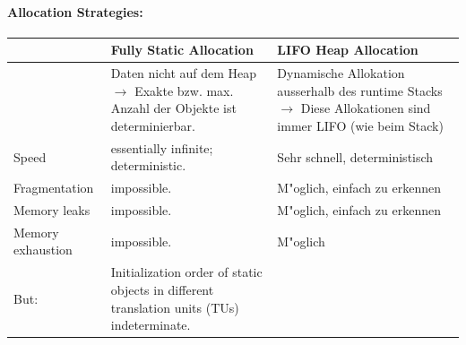 \paragraph{Allocation Strategies: }
\begin{tabular}{l||p{7cm}|p{7cm}|}
                        &  Fully Static Allocation & LIFO Heap Allocation\\
    \hline \hline
                        &   Daten nicht auf dem Heap $\rightarrow$ Exakte bzw. max. Anzahl der Objekte ist determinierbar. & Dynamische Allokation ausserhalb des runtime Stacks $\rightarrow$ Diese Allokationen sind immer LIFO (wie beim Stack)\\
    Speed               &   essentially infinite; deterministic.    & Sehr schnell, deterministisch \\
    Fragmentation       & impossible. & M"oglich, einfach zu erkennen\\
    Memory leaks        & impossible. & M"oglich, einfach zu erkennen\\
    Memory exhaustion   & impossible. & M"oglich\\
\hline \hline
But: & Initialization order of static objects in different translation units (TUs) indeterminate. & \\
\end{tabular}

\vspace{1cm}


